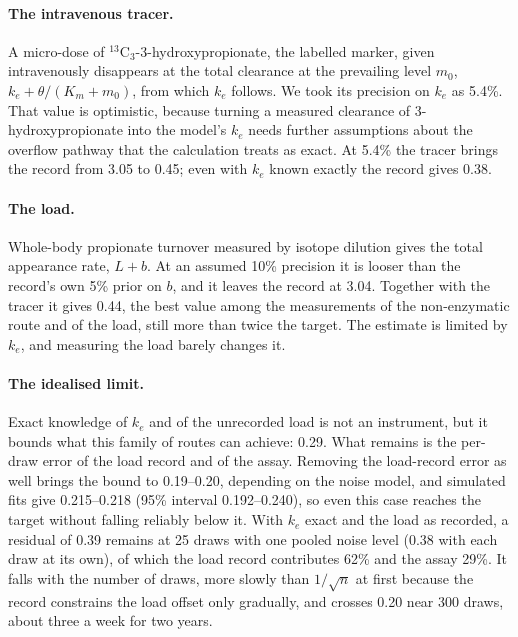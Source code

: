 \paragraph{The intravenous tracer.} A micro-dose of $^{13}$C$_3$-3-hydroxypropionate, the
labelled marker, given intravenously disappears at the total clearance at the prevailing level $m_0$,
$k_e+\theta/(K_m+m_0)$, from which $k_e$ follows. We took its precision on $k_e$ as 5.4\%.
That value is optimistic, because turning a measured clearance of 3-hydroxypropionate into the
model's $k_e$ needs further assumptions about the overflow pathway that the calculation treats as
exact. At 5.4\% the tracer brings the record from 3.05 to 0.45; even with $k_e$ known exactly
the record gives 0.38.

\paragraph{The load.} Whole-body propionate turnover measured by isotope dilution gives the
total appearance rate, $L+b$. At an assumed 10\% precision it is looser than the record's own
5\% prior on $b$, and it leaves the record at 3.04. Together with the tracer it gives 0.44, the
best value among the measurements of the non-enzymatic route and of the load, still more than
twice the target. The estimate is limited by $k_e$, and measuring the load barely changes it.

\paragraph{The idealised limit.} Exact knowledge of $k_e$ and of the unrecorded load is not an
instrument, but it bounds what this family of routes can achieve: 0.29. What remains is the
per-draw error of the load record and of the assay. Removing the load-record error as well
brings the bound to 0.19--0.20, depending on the noise model, and simulated fits give
0.215--0.218 (95\% interval 0.192--0.240), so even this case reaches the target without falling
reliably below it. With $k_e$ exact and the load as recorded, a residual of 0.39 remains at 25
draws with one pooled noise level (0.38 with each draw at its own), of which the load record
contributes 62\% and the assay 29\%. It falls with the number of draws, more slowly than
$1/\sqrt n$ at first because the record constrains the load offset only gradually, and crosses
0.20 near 300 draws, about three a week for two years.

